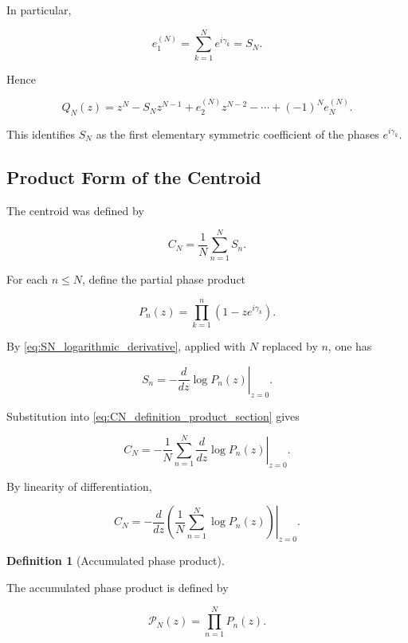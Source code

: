 \documentclass[11pt]{amsart}
\numberwithin{equation}{section}
\theoremstyle{plain}
\theoremstyle{definition}
\newtheorem{definition}[theorem]{Definition}
\theoremstyle{remark}
\begin{document}
In particular,

\begin{equation}
e_1^{(N)}
=
\sum_{k=1}^{N}
e^{i\gamma_k}
=
S_N.
\label{eq:first_elementary_coefficient_SN}
\end{equation}

Hence

\begin{equation}
Q_N(z)
=
z^N
-
S_N z^{N-1}
+
e_2^{(N)}z^{N-2}
-
\cdots
+
(-1)^N e_N^{(N)}.
\label{eq:monic_phase_polynomial_SN_coefficient}
\end{equation}

This identifies \(S_N\) as the first elementary symmetric coefficient
of the phases \(e^{i\gamma_k}\).

\subsection{Product Form of the Centroid}
\label{subsec:product_form_centroid}

The centroid was defined by

\begin{equation}
C_N
=
\frac{1}{N}
\sum_{n=1}^{N}
S_n.
\label{eq:CN_definition_product_section}
\end{equation}

For each \(n\le N\), define the partial phase product

\begin{equation}
P_n(z)
=
\prod_{k=1}^{n}
\left(1-z e^{i\gamma_k}\right).
\label{eq:partial_phase_product_definition}
\end{equation}

By \eqref{eq:SN_logarithmic_derivative}, applied with \(N\) replaced by
\(n\), one has

\begin{equation}
S_n
=
-
\left.
\frac{d}{dz}
\log P_n(z)
\right|_{z=0}.
\label{eq:Sn_partial_product_logarithmic_derivative}
\end{equation}

Substitution into \eqref{eq:CN_definition_product_section} gives

\begin{equation}
C_N
=
-
\frac{1}{N}
\sum_{n=1}^{N}
\left.
\frac{d}{dz}
\log P_n(z)
\right|_{z=0}.
\label{eq:CN_sum_logarithmic_derivatives}
\end{equation}

By linearity of differentiation,

\begin{equation}
C_N
=
-
\left.
\frac{d}{dz}
\left(
\frac{1}{N}
\sum_{n=1}^{N}
\log P_n(z)
\right)
\right|_{z=0}.
\label{eq:CN_average_logarithmic_derivative}
\end{equation}
\begin{definition}[Accumulated phase product]
\label{def:accumulated_phase_product}

The accumulated phase product is defined by

\begin{equation}
\mathcal{P}_N(z)
=
\prod_{n=1}^{N}
P_n(z).
\label{eq:accumulated_phase_product_definition}
\end{equation}

\end{definition}
\end{document}
